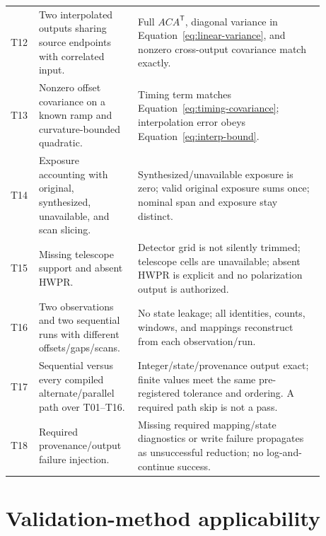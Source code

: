 \documentclass[11pt]{article}
\begin{document}
\begin{longtable}{L{0.055\linewidth}L{0.28\linewidth}L{0.55\linewidth}}
T12 & Two interpolated outputs sharing source endpoints with correlated input. & Full \(A C A^{\mathsf T}\), diagonal variance in Equation~\eqref{eq:linear-variance}, and nonzero cross-output covariance match exactly.\\
T13 & Nonzero offset covariance on a known ramp and curvature-bounded quadratic. & Timing term matches Equation~\eqref{eq:timing-covariance}; interpolation error obeys Equation~\eqref{eq:interp-bound}.\\
T14 & Exposure accounting with original, synthesized, unavailable, and scan slicing. & Synthesized/unavailable exposure is zero; valid original exposure sums once; nominal span and exposure stay distinct.\\
T15 & Missing telescope support and absent HWPR. & Detector grid is not silently trimmed; telescope cells are unavailable; absent HWPR is explicit and no polarization output is authorized.\\
T16 & Two observations and two sequential runs with different offsets/gaps/scans. & No state leakage; all identities, counts, windows, and mappings reconstruct from each observation/run.\\
T17 & Sequential versus every compiled alternate/parallel path over T01--T16. & Integer/state/provenance output exact; finite values meet the same pre-registered tolerance and ordering.  A required path skip is not a pass.\\
T18 & Required provenance/output failure injection. & Missing required mapping/state diagnostics or write failure propagates as unsuccessful reduction; no log-and-continue success.\\
\bottomrule
\end{longtable}

\section{Validation-method applicability}
\label{sec:na}
\end{document}
